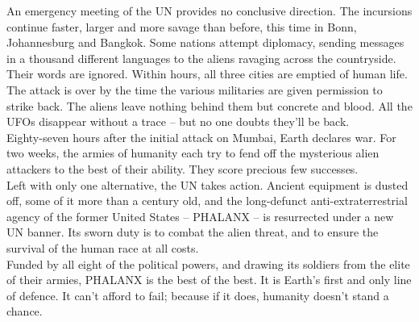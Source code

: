 An emergency meeting of the UN provides no conclusive direction. The incursions continue faster, larger and more savage than before, this time in Bonn, Johannesburg and Bangkok. Some nations attempt diplomacy, sending messages in a thousand different languages to the aliens ravaging across the countryside. Their words are ignored. Within hours, all three cities are emptied of human life. The attack is over by the time the various militaries are given permission to strike back. The aliens leave nothing behind them but concrete and blood. All the UFOs disappear without a trace -- but no one doubts they'll be back.\\
Eighty-seven hours after the initial attack on Mumbai, Earth declares war. For two weeks, the armies of humanity each try to fend off the mysterious alien attackers to the best of their ability. They score precious few successes.\\
Left with only one alternative, the UN takes action. Ancient equipment is dusted off, some of it more than a century old, and the long-defunct anti-extraterrestrial agency of the former United States -- PHALANX -- is resurrected under a new UN banner. Its sworn duty is to combat the alien threat, and to ensure the survival of the human race at all costs.\\
Funded by all eight of the political powers, and drawing its soldiers from the elite of their armies, PHALANX is the best of the best. It is Earth's first and only line of defence. It can't afford to fail; because if it does, humanity doesn't stand a chance. 


